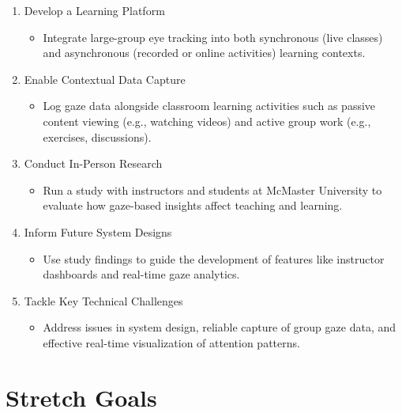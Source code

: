 \documentclass{article}
\begin{document}
\begin{enumerate}
    \item Develop a Learning Platform
    \begin{itemize}
        \item Integrate large-group eye tracking into both synchronous (live classes) 
        and asynchronous (recorded or online activities) learning contexts.
    \end{itemize}

    \item Enable Contextual Data Capture
    \begin{itemize}
        \item Log gaze data alongside classroom learning activities such as passive 
        content viewing (e.g., watching videos) and active group work 
        (e.g., exercises, discussions).
    \end{itemize}

    \item Conduct In-Person Research
    \begin{itemize}
        \item Run a study with instructors and students at McMaster University 
        to evaluate how gaze-based insights affect teaching and learning.
    \end{itemize}

    \item Inform Future System Designs
    \begin{itemize}
        \item Use study findings to guide the development of features like 
        instructor dashboards and real-time gaze analytics.
    \end{itemize}

    \item Tackle Key Technical Challenges
    \begin{itemize}
        \item Address issues in system design, reliable capture of group gaze data, 
        and effective real-time visualization of attention patterns.
    \end{itemize}
\end{enumerate}

\section{Stretch Goals}
\end{document}
